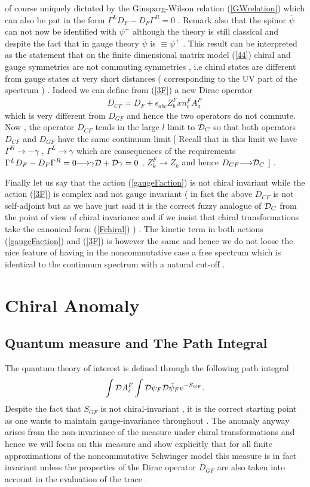 \documentclass[a4paper,10pt]{article}
\begin{document}
of course uniquely dictated by the Ginsparg-Wilson relation
(\ref{GWrelation}) which can also be put in the form
${\Gamma}^LD_F-D_F{\Gamma}^R=0$ \cite{leonardo}. Remark also that
the spinor $\bar{\psi}$ can not now be identified with
${\psi}^{+}$ although the theory is still classical and despite
the fact that in gauge theory $\bar{\psi}$ is
${\equiv}{\psi}^{+}$ . This result can be interpreted as the
statement that on the finite dimensional matrix model (\ref{44})
chiral and gauge symmetries are not commuting symmetries  , i.e
chiral states are different from gauge states at very short
distances ( corresponding to the UV part of the spectrum ) .
Indeed we can define from (\ref{3F}) a new Dirac operator
\begin{eqnarray}
D_{CF}=D_F+{\epsilon}_{abc}Z_b^Fxn^F_c{A}_{a}^F~\label{3.38}
\end{eqnarray}
which is very different from $D_{GF}$ and hence the two operators
do not commute. Now , the operator $D_{CF}$ tends in the large
$l$ limit to ${\cal D}_C$ so that both operators $D_{CF}$ and
$D_{GF}$ have the same continuum limit [ Recall that in this
limit we have ${\Gamma}^R{\longrightarrow}-{\gamma}$ ,
${\Gamma}^L{\longrightarrow}{\gamma}$ which are consequences of
the requirements
${\Gamma}^LD_F-D_F{\Gamma}^R=0{\longrightarrow}{\gamma}{\cal
D}+{\cal D}{\gamma}=0$ , $Z_{k}^{F}{\longrightarrow}Z_{k}$  and
hence $D_{CF}{\longrightarrow}{\cal D}_C$ ] .

Finally let us say that the action (\ref{gaugeFaction}) is not
chiral invariant while the action (\ref{3F}) is complex and not
gauge invariant ( in fact the above $D_{CF}$ is not self-adjoint
but as we have just said it is the correct fuzzy analogue of
${\cal D}_C$ from the point of view of chiral invariance and if
we insist that chiral transformations take the canonical form
(\ref{Fchiral}) ) . The kinetic term in both actions
(\ref{gaugeFaction}) and (\ref{3F}) is however the same and hence
we do not loose the nice feature of having in the noncommutative
case a free spectrum which is identical to the continuum spectrum
with a natural cut-off .
\section{Chiral Anomaly}
\subsection{Quantum measure and The Path Integral} The quantum
theory of interest is defined through the following path integral
\begin{eqnarray}
\int{\cal D}A_i^F\int {\cal D}{{\psi}_{F}}{\cal
D}\bar{{\psi}}_{F}e^{-S_{GF}}.\label{par}
\end{eqnarray}
Despite the fact that $S_{GF}$ is not chiral-invariant , it is
the correct starting point as one wants to maintain
gauge-invariance throughout . The anomaly anyway arises from the
non-invariance of the measure under chiral transformations
\cite{fujikawa} and hence we will focus on  this measure and show
explicitly that for all finite approximations of the
noncommutative Schwinger model this measure is in fact invariant
unless the properties of the Dirac operator $D_{GF}$ are also
taken into account in the evaluation of the trace .
\end{document}
